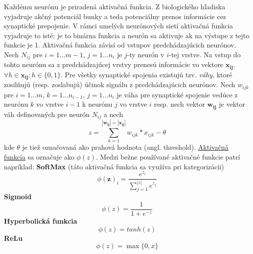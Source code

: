 Každému neurónu je priradená aktivačná funkcia.
Z biologického hľadiska vyjadruje akčný potenciál bunky a teda potenciálny prenos informácie cez synaptické prepojenie.
V rámci umelých neurónových sietí aktivačná funkcia vyjadruje to isté: je to binárna funkcia a neurón sa aktivuje
ak na výstupe z tejto funkcie je 1.
Aktivačná funkcia závisí od vstupov predchádzajúcich neurónov.
Nech $N_{ij}$ pre $i = 1 \dots m-1$, $j = 1 \dots n_i$ je $j$-ty neurón v $i$-tej vrstve.
Na vstup do tohto neurónu sa z predchádzajúcej vrstvy prenesú informácie vo vektore $\pmb{x_{ij}}$.
$\forall h \in \pmb{x_{ij}} \colon h \in \{0, 1\}$.
Pre všetky synaptické spojenia existujú tzv. \emph{váhy}, ktoré zosilňujú (resp. zoslabujú) účinok signálu z
predchádzajúcich neurónov.
Nech $w_{ijk}$ pre $i=1 \dots m$, $k=1 \dots n_{i-1}$, $j=1 \dots n_i$ je váha pre synaptické spojenie vedúce z
neurónu $k$ vo vrstve $i-1$ k neurónu $j$ vo vrstve $i$ resp.
nech vektor $\pmb{w_{ij}}$ je vektor váh definovaných pre neurón $N_{ij}$ a nech
\begin{equation}
    z = \sum_{k=1}^{|\pmb{w_{ij}}|=|\pmb{x_{ij}}|}{w_{ijk} * x_{ijk}}-\theta
\end{equation}
kde $\theta$ je tiež označovaná ako prahová hodnota (angl. threshold).
\hyperref[figure:activation-functions]{Aktivačná funkcia} sa označuje ako $\phi(z)$.
Medzi bežne používané aktivačné funkcie patrí napríklad:
\linebreak
\textbf{SoftMax} (táto aktivačná funkcia sa využíva pri kategorizácii)\cite{algo_ann_activation_softmax}
\begin{equation}
    \phi(\mathbf{z})_i = \frac{e^{z_i}}{\sum_{j=1}^{|z|}{e^{z_j}}}
\end{equation}
\textbf{Sigmoid}\cite{algo_ann_activation_sigmoid}
\begin{equation}
    \phi(z) = \frac{1}{1+e^{-z}}
\end{equation}
\textbf{Hyperbolická funkcia}\cite{algo_ann_activation_hyperbolic}
\begin{equation}
    \phi(z) = tanh(z)
\end{equation}
\textbf{ReLu}\cite{algo_ann_activation_relu}
\begin{equation}
    \phi(z) = \max\{0, x\}
\end{equation}

